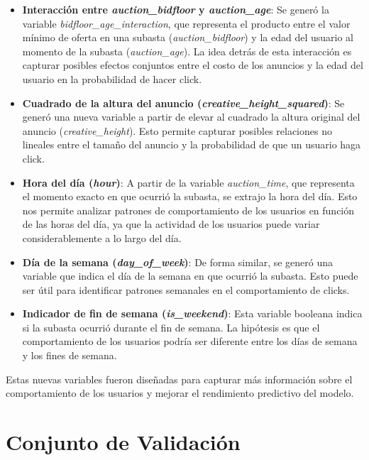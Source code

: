 \documentclass[a4paper,12pt]{article}
\begin{document}
\begin{itemize}
    \item \textbf{Interacción entre \textit{auction\_bidfloor} y \textit{auction\_age}}: Se generó la variable \textit{bidfloor\_age\_\hspace{0pt}interaction}, que representa el producto entre el valor mínimo de oferta en una subasta (\textit{auction\_bidfloor}) y la edad del usuario al momento de la subasta (\textit{auction\_age}). La idea detrás de esta interacción es capturar posibles efectos conjuntos entre el costo de los anuncios y la edad del usuario en la probabilidad de hacer click.

    \item \textbf{Cuadrado de la altura del anuncio (\textit{creative\_height\_squared})}: Se generó una nueva variable a partir de elevar al cuadrado la altura original del anuncio (\textit{creative\_height}). Esto permite capturar posibles relaciones no lineales entre el tamaño del anuncio y la probabilidad de que un usuario haga click.
    
    \item \textbf{Hora del día (\textit{hour})}: A partir de la variable \textit{auction\_time}, que representa el momento exacto en que ocurrió la subasta, se extrajo la hora del día. Esto nos permite analizar patrones de comportamiento de los usuarios en función de las horas del día, ya que la actividad de los usuarios puede variar considerablemente a lo largo del día.
    
    \item \textbf{Día de la semana (\textit{day\_of\_week})}: De forma similar, se generó una variable que indica el día de la semana en que ocurrió la subasta. Esto puede ser útil para identificar patrones semanales en el comportamiento de clicks.
    
    \item \textbf{Indicador de fin de semana (\textit{is\_weekend})}: Esta variable booleana indica si la subasta ocurrió durante el fin de semana. La hipótesis es que el comportamiento de los usuarios podría ser diferente entre los días de semana y los fines de semana.
\end{itemize}

Estas nuevas variables fueron diseñadas para capturar más información sobre el comportamiento de los usuarios y mejorar el rendimiento predictivo del modelo.

\section{Conjunto de Validación}
\end{document}

